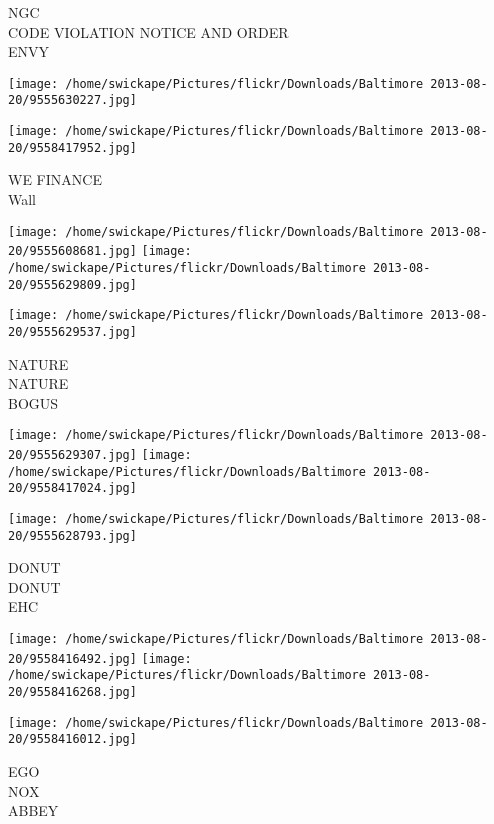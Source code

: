 \documentclass[10pt,letterpaper]{article}
\begin{document}
NGC\\
CODE VIOLATION NOTICE AND ORDER\\
ENVY\\
\pagebreak

\texttt{[image: /home/swickape/Pictures/flickr/Downloads/Baltimore 2013-08-20/9555630227.jpg]}

\vspace{0.25in}
\texttt{[image: /home/swickape/Pictures/flickr/Downloads/Baltimore 2013-08-20/9558417952.jpg]}

WE FINANCE\\
Wall\\
\pagebreak

\texttt{[image: /home/swickape/Pictures/flickr/Downloads/Baltimore 2013-08-20/9555608681.jpg]}
\texttt{[image: /home/swickape/Pictures/flickr/Downloads/Baltimore 2013-08-20/9555629809.jpg]}

\vspace{0.25in}
\texttt{[image: /home/swickape/Pictures/flickr/Downloads/Baltimore 2013-08-20/9555629537.jpg]}

NATURE\\
NATURE\\
BOGUS\\
\pagebreak

\texttt{[image: /home/swickape/Pictures/flickr/Downloads/Baltimore 2013-08-20/9555629307.jpg]}
\texttt{[image: /home/swickape/Pictures/flickr/Downloads/Baltimore 2013-08-20/9558417024.jpg]}

\vspace{0.25in}
\texttt{[image: /home/swickape/Pictures/flickr/Downloads/Baltimore 2013-08-20/9555628793.jpg]}

DONUT\\
DONUT\\
EHC\\
\pagebreak

\texttt{[image: /home/swickape/Pictures/flickr/Downloads/Baltimore 2013-08-20/9558416492.jpg]}
\texttt{[image: /home/swickape/Pictures/flickr/Downloads/Baltimore 2013-08-20/9558416268.jpg]}

\vspace{0.25in}
\texttt{[image: /home/swickape/Pictures/flickr/Downloads/Baltimore 2013-08-20/9558416012.jpg]}

EGO\\
NOX\\
ABBEY\\
\pagebreak
\end{document}
